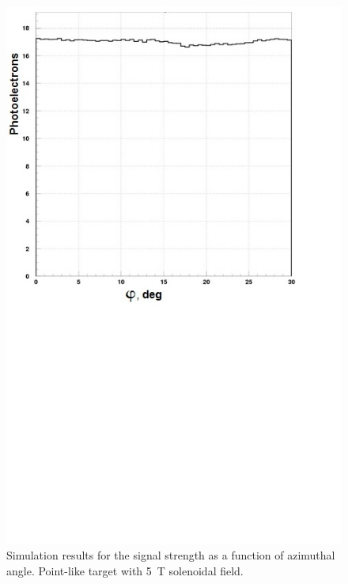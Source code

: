 \begin{figure}[!ht]
    \centering
    \includegraphics[width=1.0\linewidth,trim={0.0cm 9.4cm 0.0cm 0.0cm},clip]{images/Point_Targ_5T_Field_Phi.jpg}
    \caption{Simulation results for the signal strength as a function of azimuthal angle. Point-like target with 5~T
      solenoidal field.}
    \label{fig:Point_Targ_5T_Field_Phi}
\end{figure}

